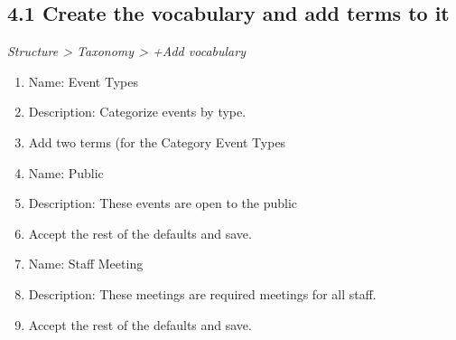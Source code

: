 \documentclass[letterpaper,10pt,english]{sphinxmanual}
\begin{document}
\subsection{4.1 Create the vocabulary and add terms to it}
\label{event_calendar:create-the-vocabulary-and-add-terms-to-it}
\emph{Structure \textgreater{} Taxonomy \textgreater{} +Add vocabulary}
\begin{enumerate}
\item {} 
Name: Event Types

\item {} 
Description: Categorize events by type.

\item {} 
Add two terms (for the Category Event Types

\item {} 
Name: Public

\item {} 
Description: These events are open to the public

\item {} 
Accept the rest of the defaults and save.

\item {} 
Name: Staff Meeting

\item {} 
Description: These meetings are required meetings for all staff.

\item {} 
Accept the rest of the defaults and save.

\end{enumerate}
\end{document}
